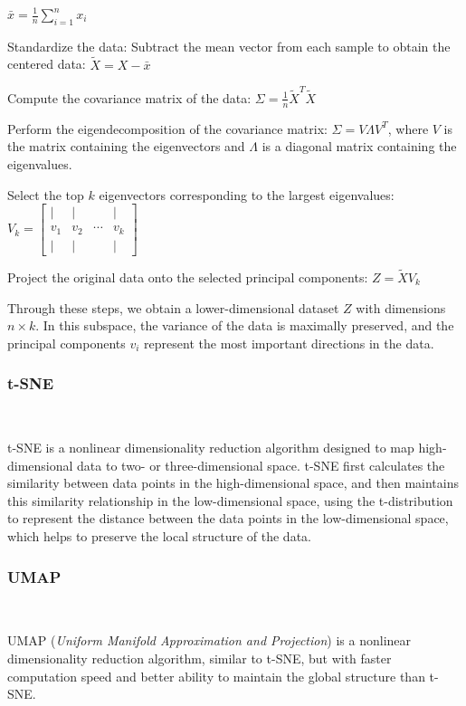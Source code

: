 \documentclass[conference]{IEEEtran}
\begin{document}
	$\bar{x} = \frac{1}{n} \sum_{i=1}^{n} x_i$
	
	Standardize the data: Subtract the mean vector from each sample to obtain the centered data: \( \tilde{X} = X - \bar{x} \)
	
	Compute the covariance matrix of the data: \( \Sigma = \frac{1}{n} \tilde{X}^T \tilde{X} \)
	
	Perform the eigendecomposition of the covariance matrix: $\Sigma = V \Lambda V^T$, where $V$ is the matrix containing the eigenvectors and $\Lambda$ is a diagonal matrix containing the eigenvalues.
	
	Select the top \(k\) eigenvectors corresponding to the largest eigenvalues: \(V_k = \begin{bmatrix} | & | & & | \\ v_1 & v_2 & \cdots & v_k \\ | & | & & | \end{bmatrix}\)
	
	Project the original data onto the selected principal components: \(Z = \tilde{X} V_k\)
	
	Through these steps, we obtain a lower-dimensional dataset \(Z\) with dimensions \(n \times k\). In this subspace, the variance of the data is maximally preserved, and the principal components \(v_i\) represent the most important directions in the data.
	
	\subsubsection{t-SNE} \
	
	t-SNE\cite{b2}\cite{b3} is a nonlinear dimensionality reduction algorithm designed to map high-dimensional data to two- or three-dimensional space. t-SNE first calculates the similarity between data points in the high-dimensional space, and then maintains this similarity relationship in the low-dimensional space, using the t-distribution to represent the distance between the data points in the low-dimensional space, which helps to preserve the local structure of the data.
	
	\subsubsection{UMAP} \
	
	UMAP\cite{b2}\cite{b3} (\emph{Uniform Manifold Approximation and Projection}) is a nonlinear dimensionality reduction algorithm, similar to t-SNE, but with faster computation speed and better ability to maintain the global structure than t-SNE.
	
\end{document}
